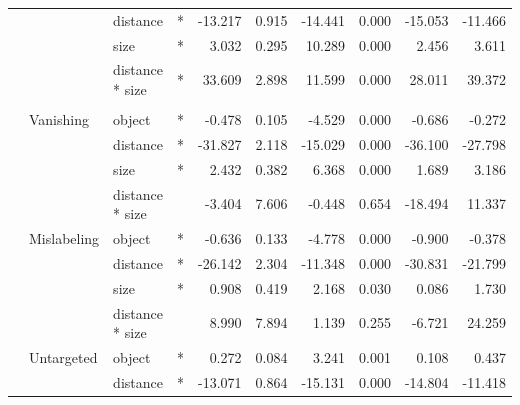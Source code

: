 \begin{longtable}[t]{llllrrrrrr}
\cmidrule{3-10}\nopagebreak
\hspace{1em} &  & distance & * & -13.217 & 0.915 & -14.441 & 0.000 & -15.053 & -11.466\\
\cmidrule{3-10}\nopagebreak
\hspace{1em} &  & size & * & 3.032 & 0.295 & 10.289 & 0.000 & 2.456 & 3.611\\
\cmidrule{3-10}\nopagebreak
\hspace{1em} &  & distance * size & * & 33.609 & 2.898 & 11.599 & 0.000 & 28.011 & 39.372\\
\cmidrule{1-10}\pagebreak[0]
\addlinespace[0.3em]
\multicolumn{10}{l}{\textbf{Faster R-CNN}}\\
\hspace{1em} & Vanishing & object & * & -0.478 & 0.105 & -4.529 & 0.000 & -0.686 & -0.272\\
\cmidrule{3-10}\nopagebreak
\hspace{1em} &  & distance & * & -31.827 & 2.118 & -15.029 & 0.000 & -36.100 & -27.798\\
\cmidrule{3-10}\nopagebreak
\hspace{1em} &  & size & * & 2.432 & 0.382 & 6.368 & 0.000 & 1.689 & 3.186\\
\cmidrule{3-10}\nopagebreak
\hspace{1em} &  & distance * size &  & -3.404 & 7.606 & -0.448 & 0.654 & -18.494 & 11.337\\
\cmidrule{2-10}\nopagebreak
\hspace{1em} & Mislabeling & object & * & -0.636 & 0.133 & -4.778 & 0.000 & -0.900 & -0.378\\
\cmidrule{3-10}\nopagebreak
\hspace{1em} &  & distance & * & -26.142 & 2.304 & -11.348 & 0.000 & -30.831 & -21.799\\
\cmidrule{3-10}\nopagebreak
\hspace{1em} &  & size & * & 0.908 & 0.419 & 2.168 & 0.030 & 0.086 & 1.730\\
\cmidrule{3-10}\nopagebreak
\hspace{1em} &  & distance * size &  & 8.990 & 7.894 & 1.139 & 0.255 & -6.721 & 24.259\\
\cmidrule{2-10}\nopagebreak
\hspace{1em} & Untargeted & object & * & 0.272 & 0.084 & 3.241 & 0.001 & 0.108 & 0.437\\
\cmidrule{3-10}\nopagebreak
\hspace{1em} &  & distance & * & -13.071 & 0.864 & -15.131 & 0.000 & -14.804 & -11.418\\

\end{longtable}
